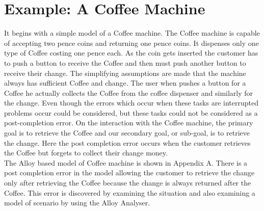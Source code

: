 \documentclass[a4paper,12pt]{extarticle}
\begin{document}
\section{Example: A Coffee Machine}
\label{Ex: Coffee machine}
It begins with a simple model of a Coffee machine. The Coffee machine is capable of accepting two pence coins and returning one pence coins. It dispenses only one type of Coffee costing one pence each. As the coin gets inserted the customer has to push a button to receive the Coffee and then must push another button to receive their change. The simplifying assumptions are made that the machine always has sufficient Coffee and change. The user when pushes a button for a Coffee he actually collects the Coffee from the coffee dispenser and similarly for the change. Even though the errors which occur when these tasks are interrupted problems occur could be considered, but these tasks could not be considered as a post-completion error. On the interaction with the Coffee machine, the primary goal is to retrieve the Coffee and our secondary goal, or sub-goal, is to retrieve the change. Here the post completion error occurs when the customer retrieves the Coffee but forgets to collect their change money. \\
The Alloy based model of Coffee machine is shown in Appendix A. There is a post completion error in the model allowing the customer to retrieve the change only after retrieving the Coffee because the change is always returned after the Coffee. This error is discovered by examining the situation and also examining a model of scenario by using the Alloy Analyser.
\end{document}

